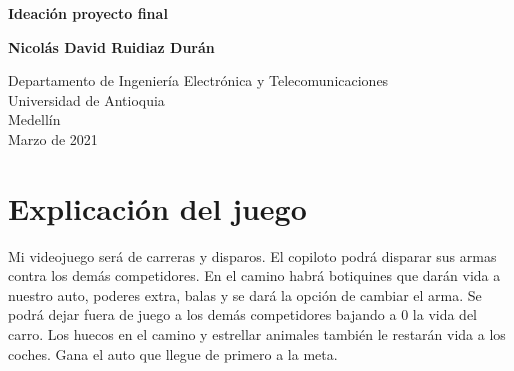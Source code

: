 \documentclass{article}
\begin{document}
\begin{titlepage}
    \begin{center}
        \vspace*{1cm}
            
        \Huge
        \textbf{Ideación proyecto final}
            
        \vspace{0.5cm}
        \LARGE
        
            
        \vspace{1.5cm}
            
        \textbf{Nicolás David Ruidiaz Durán}
            
        \vfill
            
        \vspace{0.8cm}
            
        \Large
        Departamento de Ingeniería Electrónica y Telecomunicaciones\\
        Universidad de Antioquia\\
        Medellín\\
        Marzo de 2021
            
    \end{center}
\end{titlepage}

\tableofcontents
\newpage

\section{Explicación del juego} \label{contenido}
Mi videojuego será de carreras y disparos. El copiloto podrá disparar sus armas contra los demás competidores. En el camino habrá botiquines que darán vida a nuestro auto, poderes extra, balas y se dará la opción de cambiar el arma. Se podrá dejar fuera de juego a los demás competidores bajando a 0 la vida del carro. Los huecos en el camino y estrellar animales también le restarán vida a los coches.
Gana el auto que llegue de primero a la meta. 
\end{document}
